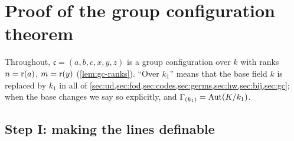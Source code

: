 \section{Proof of the group configuration theorem}
\label{sec:proof}

Throughout, $\mathfrak c=(a,b,c,x,y,z)$ is a group configuration over $k$ with ranks
$n=\operatorname{r}(a)$, $m=\operatorname{r}(y)$ (\cref{lem:gc-ranks}).  ``Over $k_1$'' means that the base field
$k$ is replaced by $k_1$ in all of \cref{sec:ud,sec:fod,sec:codes,sec:germs,sec:hw,sec:bij,sec:gc};
when the base changes we say so explicitly, and $\Gamma_{(k_1)}=\operatorname{Aut}(K/k_1)$.

\subsection{Step I: making the lines definable}

